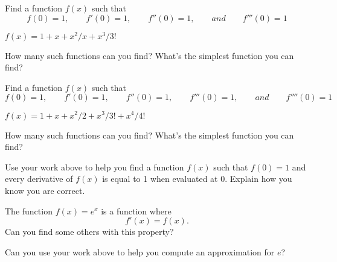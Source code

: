 \documentclass{ximera}
\begin{document}
\begin{question}
  Find a function $f(x)$ such that
  \[
  f(0) = 1,\qquad f'(0) = 1,\qquad f''(0) = 1,\qquad and \qquad f'''(0) = 1
  \]
  \begin{answer}
    $f(x) = 1+x+x^2/x + x^3/3!$
  \end{answer}
  \pause
  How many such functions can you find? What's the simplest function you
  can find?
  \begin{answer}
  \end{answer}
\end{question}

\begin{question}
  Find a function $f(x)$ such that
  \[
  f(0) = 1,\qquad f'(0) = 1, \qquad f''(0)=1, \qquad f'''(0) = 1,\qquad and \qquad f''''(0) = 1
  \]
  \begin{answer}
    $f(x) = 1+x+x^2/2+x^3/3!+x^4/4!$
  \end{answer}
  \pause
  How many such functions can you find? What's the simplest function you
  can find?
  \begin{answer}
  \end{answer}
\end{question}


\begin{question}
  Use your work above to help you find a function $f(x)$ such that $f(0)
  = 1$ and every derivative of $f(x)$ is equal to 1 when evaluated at
  $0$. Explain how you know you are correct.
  \begin{answer}
  \end{answer}
\end{question}



\begin{question}
  The function $f(x) = e^x$ is a function where
  \[
  f'(x) = f(x).
  \]
  Can you find some others with this property? 
  \begin{answer}
  \end{answer}
\end{question}

\begin{question}
  Can you use your work above to help you compute an approximation for
  $e$?
  \begin{answer}
  \end{answer}
\end{question}
\end{document}
